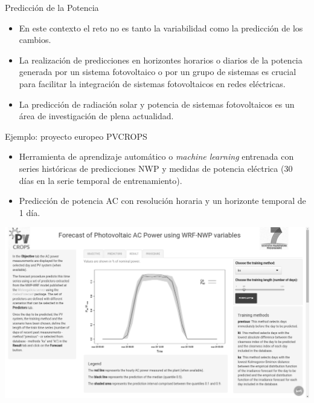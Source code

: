 \documentclass[aspectratio=169, usenames,svgnames,dvipsnames]{beamer}
\begin{document}
\begin{frame}[label={sec:orgcee2165}]{Predicción de la Potencia}
\begin{itemize}
\item En este contexto el reto no es tanto la variabilidad como la
predicción de los cambios.
\item La realización de predicciones en horizontes horarios o diarios de
la potencia generada por un sistema fotovoltaico o por un grupo de
sistemas es crucial para facilitar la integración de sistemas
fotovoltaicos en redes eléctricas.
\item La predicción de radiación solar y potencia de sistemas
fotovoltaicos es un área de investigación de plena actualidad.
\end{itemize}
\end{frame}

\begin{frame}[label={sec:orgb020f25}]{Ejemplo: proyecto europeo PVCROPS}
\begin{itemize}
\item Herramienta de aprendizaje automático o \emph{machine learning}
entrenada con series históricas de predicciones NWP y medidas de
potencia eléctrica (30 días en la serie temporal de
entrenamiento).
\item Predicción de potencia AC con resolución horaria y un horizonte
temporal de 1 día.
\end{itemize}


\begin{center}
\includegraphics[height=0.5\textheight]{../figs/ForecastShiny.png}
\end{center}
\end{frame}
\end{document}
